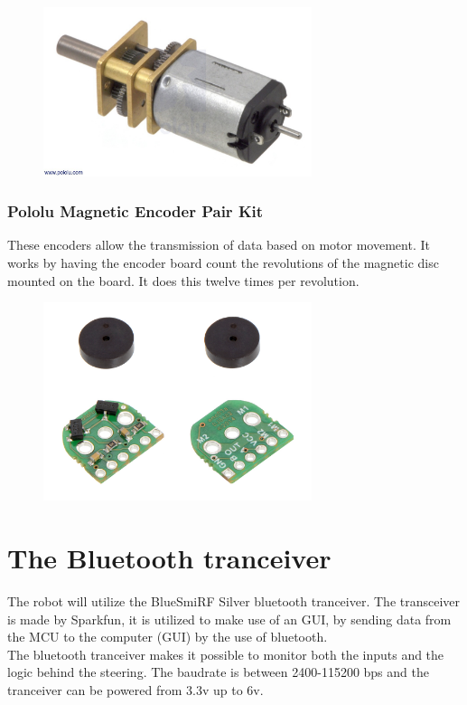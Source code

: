 \begin{figure}[!ht]
	\centering
	\includegraphics[width=0.7\textwidth]{figures/pololu.jpg}
	\caption{}
	\label{Hardware diagram}
\end{figure}

\subsubsection{Pololu Magnetic Encoder Pair Kit}

These encoders allow the transmission of data based on motor movement. It works by having the encoder board count the revolutions of the magnetic disc mounted on the board. It does this twelve times per revolution.

\begin{figure}[!ht]
	\centering
	\includegraphics[width=0.7\textwidth]{figures/pololuEncoder.jpg}
	\caption{}
	\label{Hardware diagram}
\end{figure}

\section{The Bluetooth tranceiver}
The robot will utilize the BlueSmiRF Silver bluetooth tranceiver. The transceiver is made by Sparkfun, it is utilized to make use of an GUI, by sending data from the MCU to the computer (GUI) by the use of bluetooth.\\ The bluetooth tranceiver makes it possible to monitor both the inputs and the logic behind the steering. The baudrate is between 2400-115200 bps and the tranceiver can be powered from 3.3v up to 6v. 

